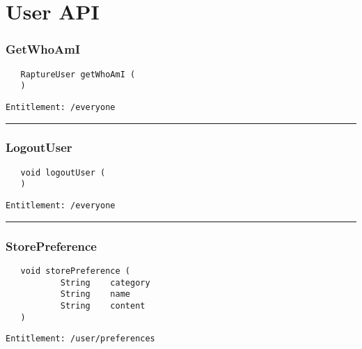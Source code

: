 \chapter{User API}

\subsection{GetWhoAmI}
\label{Api:GetWhoAmI}
\begin{Verbatim}
   RaptureUser getWhoAmI (
   )
\end{Verbatim}
\begin{Verbatim}[formatcom=\color{Maroon}]
  Entitlement: /everyone
\end{Verbatim}



\rule{12cm}{2pt}
\subsection{LogoutUser}
\label{Api:LogoutUser}
\begin{Verbatim}
   void logoutUser (
   )
\end{Verbatim}
\begin{Verbatim}[formatcom=\color{Maroon}]
  Entitlement: /everyone
\end{Verbatim}



\rule{12cm}{2pt}
\subsection{StorePreference}
\label{Api:StorePreference}
\begin{Verbatim}
   void storePreference (
           String    category
           String    name
           String    content
   )
\end{Verbatim}
\begin{Verbatim}[formatcom=\color{Maroon}]
  Entitlement: /user/preferences
\end{Verbatim}



